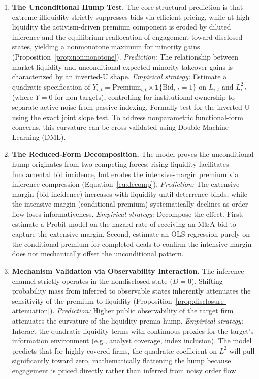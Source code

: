 \documentclass[11pt]{article}
\newcommand{\1}{\mathbf{1}}
\begin{document}
\begin{enumerate}[label=\textbf{\arabic*.}]
    \item \textbf{The Unconditional Hump Test.} The core structural prediction is that extreme illiquidity strictly suppresses bids via efficient pricing, while at high liquidity the activism-driven premium component is eroded by diluted inference and the equilibrium reallocation of engagement toward disclosed states, yielding a nonmonotone maximum for minority gains (Proposition~\ref{prop:nonmonotone}).
    \emph{Prediction:} The relationship between market liquidity and unconditional expected minority takeover gains is characterized by an inverted-U shape.
    \emph{Empirical strategy:} Estimate a quadratic specification of $Y_{i,t} = \text{Premium}_{i,t} \times \1\{\text{Bid}_{i,t}=1\}$ on $L_{i,t}$ and $L_{i,t}^2$ (where $Y=0$ for non-targets), controlling for institutional ownership to separate active noise from passive indexing. Formally test for the inverted-U using the exact \citet{LindMehlum2010} joint slope test. To address nonparametric functional-form concerns, this curvature can be cross-validated using Double Machine Learning (DML).

    \item \textbf{The Reduced-Form Decomposition.} The model proves the unconditional hump originates from two competing forces: rising liquidity facilitates fundamental bid incidence, but erodes the intensive-margin premium via inference compression (Equation~\ref{eq:decomp}).
    \emph{Prediction:} The extensive margin (bid incidence) increases with liquidity until deterrence binds, while the intensive margin (conditional premium) systematically declines as order flow loses informativeness.
    \emph{Empirical strategy:} Decompose the effect. First, estimate a Probit model on the hazard rate of receiving an M\&A bid to capture the extensive margin. Second, estimate an OLS regression purely on the conditional premium for completed deals to confirm the intensive margin does not mechanically offset the unconditional pattern.

    \item \textbf{Mechanism Validation via Observability Interaction.} The inference channel strictly operates in the nondisclosed state ($D=0$). Shifting probability mass from inferred to observable states inherently attenuates the sensitivity of the premium to liquidity (Proposition~\ref{prop:disclosure-attenuation}).
    \emph{Prediction:} Higher public observability of the target firm attenuates the curvature of the liquidity-premia hump.
    \emph{Empirical strategy:} Interact the quadratic liquidity terms with continuous proxies for the target's information environment (e.g., analyst coverage, index inclusion). The model predicts that for highly covered firms, the quadratic coefficient on $L^2$ will pull significantly toward zero, mathematically flattening the hump because engagement is priced directly rather than inferred from noisy order flow.


\end{enumerate}
\end{document}

